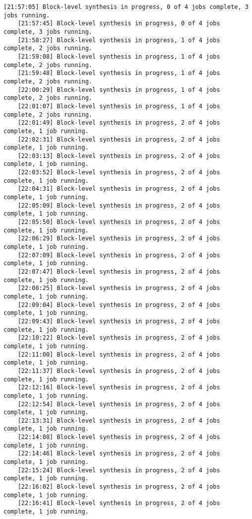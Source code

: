 \begin{lstlisting}[caption=Содержимое файла v++\_vinc.log для измененного проекта, label={log2}]
	[21:57:05] Block-level synthesis in progress, 0 of 4 jobs complete, 3 jobs running.
	[21:57:45] Block-level synthesis in progress, 0 of 4 jobs complete, 3 jobs running.
	[21:58:27] Block-level synthesis in progress, 1 of 4 jobs complete, 2 jobs running.
	[21:59:08] Block-level synthesis in progress, 1 of 4 jobs complete, 2 jobs running.
	[21:59:48] Block-level synthesis in progress, 1 of 4 jobs complete, 2 jobs running.
	[22:00:29] Block-level synthesis in progress, 1 of 4 jobs complete, 2 jobs running.
	[22:01:07] Block-level synthesis in progress, 1 of 4 jobs complete, 2 jobs running.
	[22:01:49] Block-level synthesis in progress, 2 of 4 jobs complete, 1 job running.
	[22:02:31] Block-level synthesis in progress, 2 of 4 jobs complete, 1 job running.
	[22:03:13] Block-level synthesis in progress, 2 of 4 jobs complete, 1 job running.
	[22:03:52] Block-level synthesis in progress, 2 of 4 jobs complete, 1 job running.
	[22:04:31] Block-level synthesis in progress, 2 of 4 jobs complete, 1 job running.
	[22:05:09] Block-level synthesis in progress, 2 of 4 jobs complete, 1 job running.
	[22:05:50] Block-level synthesis in progress, 2 of 4 jobs complete, 1 job running.
	[22:06:29] Block-level synthesis in progress, 2 of 4 jobs complete, 1 job running.
	[22:07:09] Block-level synthesis in progress, 2 of 4 jobs complete, 1 job running.
	[22:07:47] Block-level synthesis in progress, 2 of 4 jobs complete, 1 job running.
	[22:08:25] Block-level synthesis in progress, 2 of 4 jobs complete, 1 job running.
	[22:09:04] Block-level synthesis in progress, 2 of 4 jobs complete, 1 job running.
	[22:09:43] Block-level synthesis in progress, 2 of 4 jobs complete, 1 job running.
	[22:10:22] Block-level synthesis in progress, 2 of 4 jobs complete, 1 job running.
	[22:11:00] Block-level synthesis in progress, 2 of 4 jobs complete, 1 job running.
	[22:11:37] Block-level synthesis in progress, 2 of 4 jobs complete, 1 job running.
	[22:12:16] Block-level synthesis in progress, 2 of 4 jobs complete, 1 job running.
	[22:12:54] Block-level synthesis in progress, 2 of 4 jobs complete, 1 job running.
	[22:13:31] Block-level synthesis in progress, 2 of 4 jobs complete, 1 job running.
	[22:14:08] Block-level synthesis in progress, 2 of 4 jobs complete, 1 job running.
	[22:14:46] Block-level synthesis in progress, 2 of 4 jobs complete, 1 job running.
	[22:15:24] Block-level synthesis in progress, 2 of 4 jobs complete, 1 job running.
	[22:16:02] Block-level synthesis in progress, 2 of 4 jobs complete, 1 job running.
	[22:16:41] Block-level synthesis in progress, 2 of 4 jobs complete, 1 job running.

\end{lstlisting}
